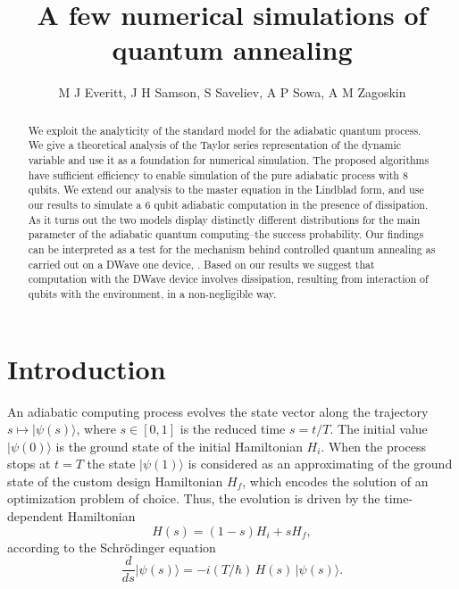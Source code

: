 \documentclass[11 pt]{article}
\begin{document}
\title{A few numerical simulations of quantum annealing}
\author{M J Everitt,  J H Samson, S Saveliev, A P Sowa, A M Zagoskin }

\date{}
\maketitle
\newtheorem{definition}{Definition}[section]
\newtheorem{theorem}{Theorem}[section]
\newtheorem{lemma}{Lemma}[section]
\newtheorem{corollary}{Corollary}[section]

\begin{abstract}
We exploit the analyticity of the standard model for the adiabatic quantum process.  We give a theoretical analysis of the Taylor series representation of the dynamic variable and use it as a foundation for numerical simulation. The proposed algorithms have sufficient efficiency to enable simulation of the pure adiabatic process with 8 qubits. We extend our analysis to the master equation in the Lindblad form, and use our results to simulate a 6 qubit adiabatic computation in the presence of dissipation. As it turns out the two models display distinctly different distributions for the main parameter of the adiabatic quantum computing--the success probability. Our findings can be interpreted as a test for the mechanism behind controlled quantum annealing as carried out on a DWave one device, \cite{Boxio}. Based on our results we suggest that computation with the DWave device involves dissipation, resulting from interaction of qubits with the environment, in a non-negligible way.
\end{abstract}

\section{Introduction}

An adiabatic computing process evolves the state vector along the trajectory $s\mapsto |\psi(s)\rangle$, where $s\in[0,1]$ is the reduced time $s=t/T$. The initial value $|\psi(0)\rangle$ is the ground state of the initial Hamiltonian $H_i$. When the process stops at $t=T$ the state $|\psi(1)\rangle$ is considered as an approximating of the ground state of the custom design Hamiltonian $H_f$, which encodes the solution of an optimization problem of choice. Thus, the evolution is driven by the time-dependent Hamiltonian
\begin{equation}\label{Ham_of_s}
H(s) = (1-s) H_i +s H_f,
\end{equation}
according to the Schr\"{o}dinger equation
\begin{equation}\label{Schr_of_s}
\frac{d}{ds} |\psi(s)\rangle= -i(T/\hbar)\, H(s)\,|\psi(s)\rangle.
\end{equation}
\end{document}
